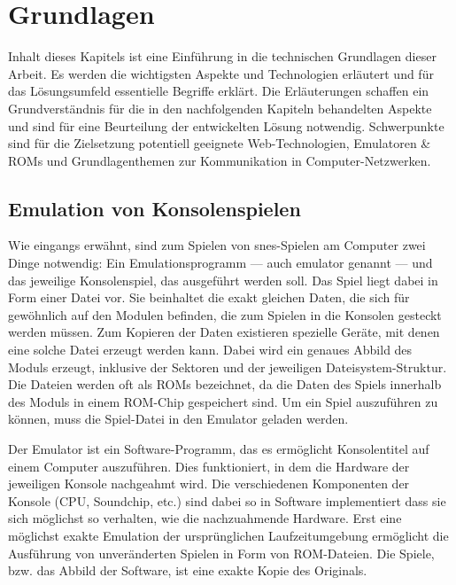 \chapter{Grundlagen}\label{grundlagen}

Inhalt dieses Kapitels ist eine Einführung in die technischen Grundlagen
dieser Arbeit. Es werden die wichtigsten Aspekte und Technologien
erläutert und für das Lösungsumfeld essentielle Begriffe erklärt. Die
Erläuterungen schaffen ein Grundverständnis für die in den nachfolgenden
Kapiteln behandelten Aspekte und sind für eine Beurteilung der
entwickelten Lösung notwendig. Schwerpunkte sind für die Zielsetzung
potentiell geeignete Web-Technologien, Emulatoren \& ROMs und
Grundlagenthemen zur Kommunikation in Computer-Netzwerken.

\newpage

\section{Emulation von
Konsolenspielen}\label{emulation-von-konsolenspielen}

Wie eingangs erwähnt, sind zum Spielen von \gls{snes}-Spielen am
Computer zwei Dinge notwendig: Ein Emulationsprogramm --- auch
\gls{emulator} genannt --- und das jeweilige Konsolenspiel, das
ausgeführt werden soll. Das Spiel liegt dabei in Form einer Datei vor.
Sie beinhaltet die exakt gleichen Daten, die sich für gewöhnlich auf den
Modulen befinden, die zum Spielen in die Konsolen gesteckt werden
müssen. Zum Kopieren der Daten existieren spezielle Geräte, mit denen
eine solche Datei erzeugt werden kann. Dabei wird ein genaues Abbild des
Moduls erzeugt, inklusive der Sektoren und der jeweiligen
Dateisystem-Struktur. Die Dateien werden oft als ROMs bezeichnet, da die
Daten des Spiels innerhalb des Moduls in einem ROM-Chip gespeichert
sind. Um ein Spiel auszuführen zu können, muss die Spiel-Datei in den
Emulator geladen werden.

Der Emulator ist ein Software-Programm, das es ermöglicht Konsolentitel
auf einem Computer auszuführen. Dies funktioniert, in dem die Hardware
der jeweiligen Konsole nachgeahmt wird. Die verschiedenen Komponenten
der Konsole (CPU, Soundchip, etc.) sind dabei so in Software
implementiert dass sie sich möglichst so verhalten, wie die
nachzuahmende Hardware. Erst eine möglichst exakte Emulation der
ursprünglichen Laufzeitumgebung ermöglicht die Ausführung von
unveränderten Spielen in Form von ROM-Dateien. Die Spiele, bzw. das
Abbild der Software, ist eine exakte Kopie des Originals.


